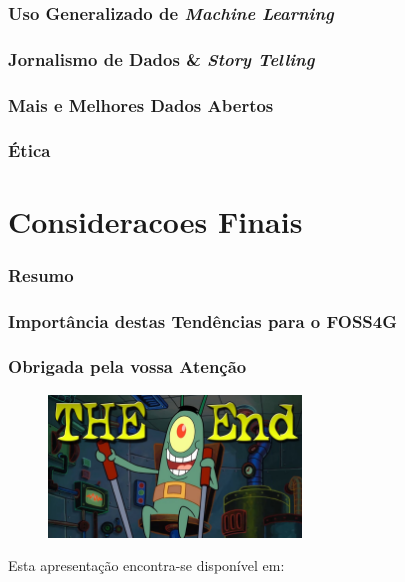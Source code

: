 \documentclass[hyperref={pdfpagelabels=true}]{beamer}
\begin{document}
\begin{frame}
\frametitle{Uso Generalizado de \textit{Machine Learning}}


\end{frame}

\begin{frame}
\frametitle{Jornalismo de Dados \& \textit{Story Telling}}


\end{frame}

\begin{frame}
\frametitle{Mais e Melhores Dados Abertos}


\end{frame}

\begin{frame}
\frametitle{\'{E}tica}


\end{frame}

\section{Consideracoes Finais} 
\begin{frame}
\frametitle{Resumo}


\end{frame}

\begin{frame}
\frametitle{Import\^{a}ncia destas Tend\^{e}ncias para o FOSS4G}


\end{frame}

\begin{frame}
\frametitle{Obrigada pela vossa Aten\c{c}\~{a}o}
    \begin{figure}   
      \includegraphics[width=0.6\textwidth]{end.jpg}      
    \end{figure}   
    Esta apresenta\c{c}\~{a}o encontra-se dispon\'{i}vel em: 
      \vspace{5mm}    
\end{frame}
\end{document}

